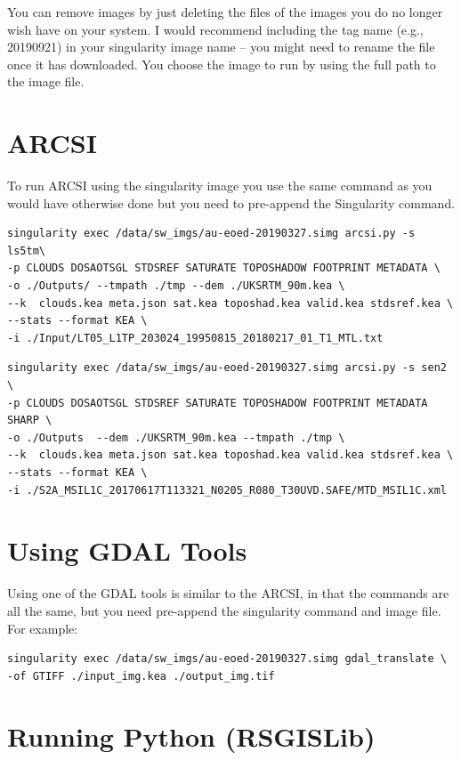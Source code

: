 \documentclass[authoryear, 11pt, oneside]{report}
\begin{document}
You can remove images by just deleting the files of the images you do no longer wish have on your system. I would recommend including the tag name (e.g., 20190921) in your singularity image name -- you might need to rename the file once it has downloaded. You choose the image to run by using the full path to the image file.

\section{ARCSI}

To run ARCSI using the singularity image you use the same command as you would have otherwise done but you need to pre-append the Singularity command.

\begin{verbatim}
singularity exec /data/sw_imgs/au-eoed-20190327.simg arcsi.py -s ls5tm\
-p CLOUDS DOSAOTSGL STDSREF SATURATE TOPOSHADOW FOOTPRINT METADATA \
-o ./Outputs/ --tmpath ./tmp --dem ./UKSRTM_90m.kea \
--k  clouds.kea meta.json sat.kea toposhad.kea valid.kea stdsref.kea \
--stats --format KEA \
-i ./Input/LT05_L1TP_203024_19950815_20180217_01_T1_MTL.txt
\end{verbatim}
\newpage
\begin{verbatim}
singularity exec /data/sw_imgs/au-eoed-20190327.simg arcsi.py -s sen2 \
-p CLOUDS DOSAOTSGL STDSREF SATURATE TOPOSHADOW FOOTPRINT METADATA SHARP \
-o ./Outputs  --dem ./UKSRTM_90m.kea --tmpath ./tmp \
--k  clouds.kea meta.json sat.kea toposhad.kea valid.kea stdsref.kea \
--stats --format KEA \
-i ./S2A_MSIL1C_20170617T113321_N0205_R080_T30UVD.SAFE/MTD_MSIL1C.xml
\end{verbatim}

\section{Using GDAL Tools}

Using one of the GDAL tools is similar to the ARCSI, in that the commands are all the same, but you need pre-append the singularity command and image file. For example:

\begin{verbatim}
singularity exec /data/sw_imgs/au-eoed-20190327.simg gdal_translate \
-of GTIFF ./input_img.kea ./output_img.tif
\end{verbatim}

\section{Running Python (RSGISLib)}
\end{document}
